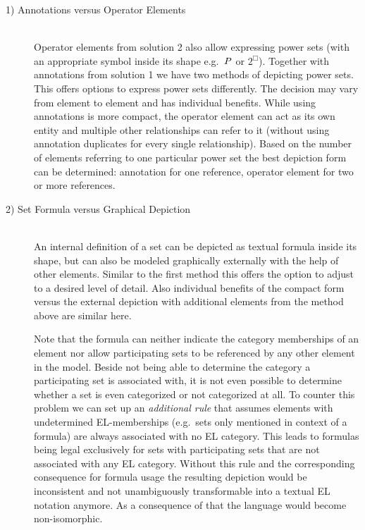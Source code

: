 \documentclass[twoside, openright, 12pt]{book}
\begin{document}
\begin{description}
\item[1) Annotations versus Operator Elements]\hfill \\
Operator elements from solution 2 also allow expressing power sets (with an appropriate symbol inside its shape e.g.\ $\euscr{P}$ or $2^{\Box}$).
Together with annotations from solution 1 we have two methods of depicting power sets.
This offers options to express power sets differently.
The decision may vary from element to element and has individual benefits.
While using annotations is more compact, the operator element can act as its own entity and multiple other relationships can refer to it (without using annotation duplicates for every single relationship).
Based on the number of elements referring to one particular power set the best depiction form can be determined: annotation for one reference, operator element for two or more references.

\item[2) Set Formula versus Graphical Depiction]\hfill \\
An internal definition of a set can be depicted as textual formula inside its shape, but can also be modeled graphically externally with the help of other elements.
Similar to the first method this offers the option to adjust to a desired level of detail.
Also individual benefits of the compact form versus the external depiction with additional elements from the method above are similar here.

Note that the formula can neither indicate the category memberships of an element nor allow participating sets to be referenced by any other element in the model.
Beside not being able to determine the category a participating set is associated with, it is not even possible to determine whether a set is even categorized or not categorized at all.
To counter this problem we can set up an \textit{additional rule} that assumes elements with undetermined EL-memberships (e.g.\ sets only mentioned in context of a formula) are always associated with no EL category.
This leads to formulas being legal exclusively for sets with participating sets that are not associated with any EL category.
Without this rule and the corresponding consequence for formula usage the resulting depiction would be inconsistent and not unambiguously transformable into a textual EL notation anymore.
As a consequence of that the language would become non-isomorphic.


\end{description}
\end{document}

